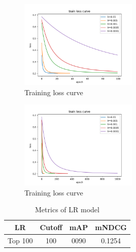 \begin{figure}
    \centering
    \includegraphics[width=0.5\textwidth]{aseets/epochto100.png}
    \caption{Training loss curve}
    \label{fig:lr_100}
\end{figure}
\begin{figure}
    \centering
    \includegraphics[width=0.5\textwidth]{aseets/epochto1000.png}
    \caption{Training loss curve}
    \label{fig:lr_1000}
\end{figure}
\begin{table}[ht]
    \centering
    \caption{Metrics of LR model}
    \label{tab:lr_metrics}
    \begin{tabular}{|c|c|c|c|}
        \hline
        LR & Cutoff & mAP & mNDCG \\
        \hline
        Top 100 & 100 & 0090 & 0.1254 \\
        \hline
    \end{tabular}
\end{table}